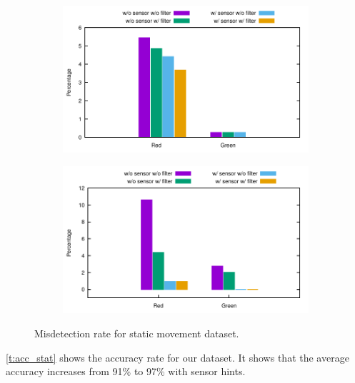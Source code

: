 \begin{figure}[!ht]
  \centering

  \begin {subfigure}
    \centering
    \includegraphics[width=4.2in]{plots/bar_fp.pdf}
  \end{subfigure}

  \begin{subfigure}
    \centering
    \includegraphics[width=4.2in]{plots/bar_fn.pdf}
  \end{subfigure}

  
  \caption{Misdetection rate for static movement dataset.}
  \label{f:fp_stat}
\end{figure}

\ref{t:acc_stat} shows the accuracy rate for our  dataset.
It shows that the average accuracy increases from 91\% to 97\% with sensor hints.

